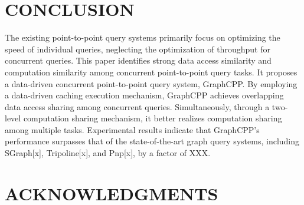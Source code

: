 \documentclass[lettersize,journal]{IEEEtran} %
\begin{document}
\section{CONCLUSION}
The existing point-to-point query systems primarily focus on optimizing the speed of individual queries, neglecting the optimization of throughput for concurrent queries. This paper identifies strong data access similarity and computation similarity among concurrent point-to-point query tasks. It proposes a data-driven concurrent point-to-point query system, GraphCPP. By employing a data-driven caching execution mechanism, GraphCPP achieves overlapping data access sharing among concurrent queries. Simultaneously, through a two-level computation sharing mechanism, it better realizes computation sharing among multiple tasks. Experimental results indicate that GraphCPP's performance surpasses that of the state-of-the-art graph query systems, including SGraph[x], Tripoline[x], and Pnp[x], by a factor of XXX.

\section{ACKNOWLEDGMENTS}
\end{document}
